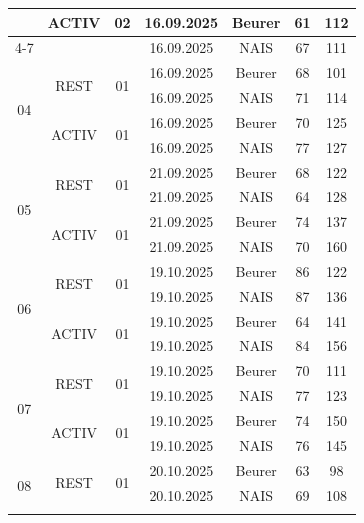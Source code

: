 \documentclass[a4paper, 11pt]{scrartcl}
\begin{document}
\begin{table}[htbp]
{\begin{tabular}{|c|c|c|c|c|c|c|}
& \multirow{2}{*}{ACTIV}
& \multirow{2}{*}{02} & 16.09.2025 & Beurer & 61 & 112 \\ \cline{4-7}
& & & 16.09.2025 & NAIS & 67 & 111 \\
\hline


\multirow{4}{*}{04}
& \multirow{2}{*}{REST}
& \multirow{2}{*}{01} & 16.09.2025 & Beurer & 68 & 101 \\ \cline{4-7}
& & & 16.09.2025 & NAIS & 71 & 114 \\ \cline{2-7}

& \multirow{2}{*}{ACTIV}
& \multirow{2}{*}{01} & 16.09.2025 & Beurer & 70 & 125 \\ \cline{4-7}
& & & 16.09.2025 & NAIS & 77 & 127 \\
\hline


\multirow{4}{*}{05}
& \multirow{2}{*}{REST}
& \multirow{2}{*}{01} & 21.09.2025 & Beurer & 68 & 122 \\ \cline{4-7}
& & & 21.09.2025 & NAIS & 64 & 128 \\ \cline{2-7}

& \multirow{2}{*}{ACTIV}
& \multirow{2}{*}{01} & 21.09.2025 & Beurer & 74 & 137 \\ \cline{4-7}
& & & 21.09.2025 & NAIS & 70 & 160 \\
\hline


\multirow{4}{*}{06}
& \multirow{2}{*}{REST}
& \multirow{2}{*}{01} & 19.10.2025 & Beurer & 86 & 122 \\ \cline{4-7}
& & & 19.10.2025 & NAIS & 87 & 136 \\ \cline{2-7}

& \multirow{2}{*}{ACTIV}
& \multirow{2}{*}{01} & 19.10.2025 & Beurer & 64 & 141 \\ \cline{4-7}
& & & 19.10.2025 & NAIS & 84 & 156 \\
\hline


\multirow{4}{*}{07}
& \multirow{2}{*}{REST}
& \multirow{2}{*}{01} & 19.10.2025 & Beurer & 70 & 111 \\ \cline{4-7}
& & & 19.10.2025 & NAIS & 77 & 123 \\ \cline{2-7}

& \multirow{2}{*}{ACTIV}
& \multirow{2}{*}{01} & 19.10.2025 & Beurer & 74 & 150 \\ \cline{4-7}
& & & 19.10.2025 & NAIS & 76 & 145 \\
\hline


\multirow{4}{*}{08}
& \multirow{2}{*}{REST}
& \multirow{2}{*}{01} & 20.10.2025 & Beurer & 63 & 98 \\ \cline{4-7}
& & & 20.10.2025 & NAIS & 69 & 108 \\ \cline{2-7}


\end{tabular}}
\end{table}
\end{document}
